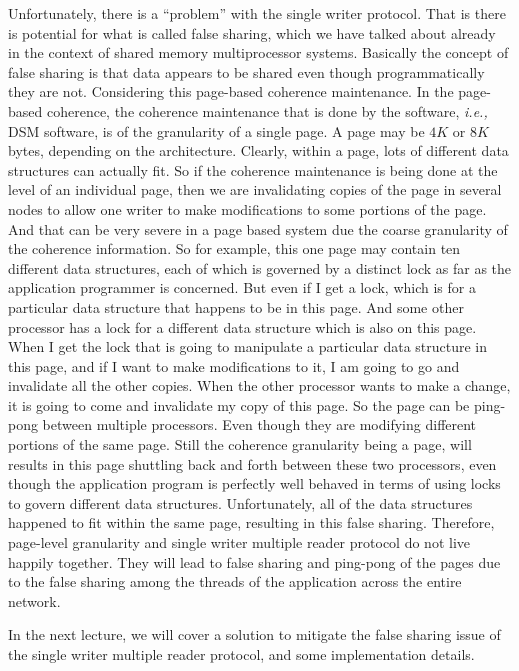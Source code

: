 \documentclass[11pt]{lecture}
\begin{document}
Unfortunately, there is a ``problem'' with the single writer protocol. That is there is potential for 
what is called false sharing, which we have talked about already in the context of shared memory multiprocessor 
systems. Basically the concept of false sharing is that data appears to be shared even though programmatically they 
are not. Considering this page-based coherence maintenance. In the page-based coherence, 
the coherence maintenance that is done by the software, {\it i.e.,} DSM software, is of the granularity 
of a single page. A page may be $4K$ or $8K$ bytes, depending on the architecture. Clearly, within a page, 
lots of different data structures can actually fit. So if the coherence maintenance is being done at 
the level of an individual page, then we are invalidating copies of the page in several nodes to allow one 
writer to make modifications to some portions of the page. And that can be very severe in a page based 
system due the coarse granularity of the coherence information. So for example, this one page may 
contain ten different data structures, each of which is governed by a distinct lock as far as 
the application programmer is concerned. But even if I get a lock, which is for a particular data 
structure that happens to be in this page. And some other processor has a lock for a different data structure which is 
also on this page. When I get the lock that is going to manipulate a particular data structure in this 
page, and if I want to make modifications to it, I am going to go and invalidate all the other copies. 
When the other processor wants to make a change, it is going to come and invalidate my copy 
of this page. So the page can be ping-pong between multiple processors. Even though they are modifying 
different portions of the same page. Still the coherence granularity being a page, will results in this 
page shuttling back and forth between these two processors, even though the application program 
is perfectly well behaved in terms of using locks to govern different data structures. Unfortunately, all 
of the data structures happened to fit within the same page, resulting in this false sharing. Therefore, 
page-level granularity and single writer multiple reader protocol do not live happily together. 
They will lead to false sharing and ping-pong of the pages due to the false sharing among the 
threads of the application across the entire network.

In the next lecture, we will cover a solution to mitigate the false sharing issue of the single 
writer multiple reader protocol, and some implementation details.





\end{document}
